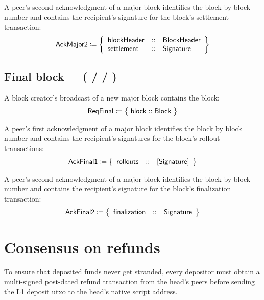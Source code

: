 \documentclass[../hydrozoa.tex]{subfiles}
\begin{document}
A peer's second acknowledgment of a major block identifies the block by block number and contains the recipient's signature for the block's settlement transaction:
\begin{equation*}
  \mathsf{AckMajor2} \coloneq \left\{
  \begin{array}{lll}
    \mathsf{blockHeader} &::& \mathsf{BlockHeader} \\
    \mathsf{settlement} &::& \mathsf{Signature}
  \end{array}\right\}
\end{equation*}

\subsection{Final block~~~( /  / )}%
\label{h:l2-consensus-final-block}%

A block creator's broadcast of a new major block contains the block;
\begin{equation*}
  \mathsf{ReqFinal} \coloneq \;\bigr\{\; \mathsf{block} :: \mathsf{Block} \;\bigr\}
\end{equation*}

A peer's first acknowledgment of a major block identifies the block by block number and contains the recipient's signatures for the block's rollout transactions:
\begin{equation*}
  \mathsf{AckFinal1} \coloneq \left\{
  \begin{array}{lll}
    \mathsf{rollouts} &::& [\mathsf{Signature}]
  \end{array}\right\}
\end{equation*}

A peer's second acknowledgment of a major block identifies the block by block number and contains the recipient's signature for the block's finalization transaction:
\begin{equation*}
  \mathsf{AckFinal2} \coloneq \left\{
  \begin{array}{lll}
    \mathsf{finalization} &::& \mathsf{Signature}
  \end{array}\right\}
\end{equation*}

\section{Consensus on refunds}%
\label{h:l2-consensus-on-refunds}%

To ensure that deposited funds never get stranded, every depositor must obtain a multi-signed post-dated refund transaction from the head's peers before sending the L1 deposit utxo to the head's native script address.
\end{document}
